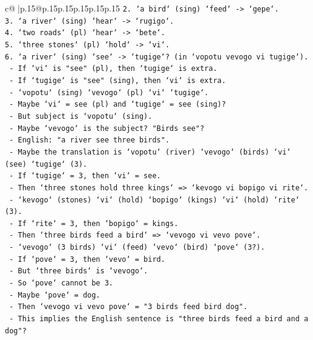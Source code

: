 \documentclass{article}
\begin{document}
{\begin{supertabular}{c@{$\;$}|p{.15\linewidth}@{}p{.15\linewidth}p{.15\linewidth}p{.15\linewidth}p{.15\linewidth}p{.15\linewidth}}
{{{\texttt{2. `a bird` (sing) `feed` {-}> `gepe`.} \\
\texttt{3. `a river` (sing) `hear` {-}> `rugigo`.} \\
\texttt{4. `two roads` (pl) `hear` {-}> `bete`.} \\
\texttt{5. `three stones` (pl) `hold` {-}> `vi`.} \\
\texttt{6. `a river` (sing) `see` {-}> `tugige`? (in `vopotu vevogo vi tugige`).} \\
\texttt{   {-} If `vi` is "see" (pl), then `tugige` is extra.} \\
\texttt{   {-} If `tugige` is "see" (sing), then `vi` is extra.} \\
\texttt{   {-} `vopotu` (sing) `vevogo` (pl) `vi` `tugige`.} \\
\texttt{   {-} Maybe `vi` = see (pl) and `tugige` = see (sing)?} \\
\texttt{   {-} But subject is `vopotu` (sing).} \\
\texttt{   {-} Maybe `vevogo` is the subject? "Birds see"?} \\
\texttt{   {-} English: "a river see three birds".} \\
\texttt{   {-} Maybe the translation is `vopotu` (river) `vevogo` (birds) `vi` (see) `tugige` (3).} \\
\texttt{   {-} If `tugige` = 3, then `vi` = see.} \\
\texttt{   {-} Then `three stones hold three kings` => `kevogo vi bopigo vi rite`.} \\
\texttt{   {-} `kevogo` (stones) `vi` (hold) `bopigo` (kings) `vi` (hold) `rite` (3).} \\
\texttt{   {-} If `rite` = 3, then `bopigo` = kings.} \\
\texttt{   {-} Then `three birds feed a bird` => `vevogo vi vevo pove`.} \\
\texttt{   {-} `vevogo` (3 birds) `vi` (feed) `vevo` (bird) `pove` (3?).} \\
\texttt{   {-} If `pove` = 3, then `vevo` = bird.} \\
\texttt{   {-} But `three birds` is `vevogo`.} \\
\texttt{   {-} So `pove` cannot be 3.} \\
\texttt{   {-} Maybe `pove` = dog.} \\
\texttt{   {-} Then `vevogo vi vevo pove` = "3 birds feed bird dog".} \\
\texttt{   {-} This implies the English sentence is "three birds feed a bird and a dog"?} \\
}}}
\end{supertabular}}
\end{document}
